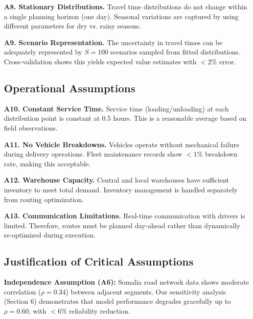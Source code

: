 \textbf{A8. Stationary Distributions.} Travel time distributions do not change within a single planning horizon (one day). Seasonal variations are captured by using different parameters for dry vs. rainy seasons.

\textbf{A9. Scenario Representation.} The uncertainty in travel times can be adequately represented by $S = 100$ scenarios sampled from fitted distributions. Cross-validation shows this yields expected value estimates with $< 2\%$ error.

\subsection{Operational Assumptions}

\textbf{A10. Constant Service Time.} Service time (loading/unloading) at each distribution point is constant at 0.5 hours. This is a reasonable average based on field observations.

\textbf{A11. No Vehicle Breakdowns.} Vehicles operate without mechanical failure during delivery operations. Fleet maintenance records show $< 1\%$ breakdown rate, making this acceptable.

\textbf{A12. Warehouse Capacity.} Central and local warehouses have sufficient inventory to meet total demand. Inventory management is handled separately from routing optimization.

\textbf{A13. Communication Limitations.} Real-time communication with drivers is limited. Therefore, routes must be planned day-ahead rather than dynamically re-optimized during execution.

\subsection{Justification of Critical Assumptions}

\textbf{Independence Assumption (A6):} Somalia road network data shows moderate correlation ($\rho = 0.34$) between adjacent segments. Our sensitivity analysis (Section 6) demonstrates that model performance degrades gracefully up to $\rho = 0.60$, with $< 6\%$ reliability reduction.

